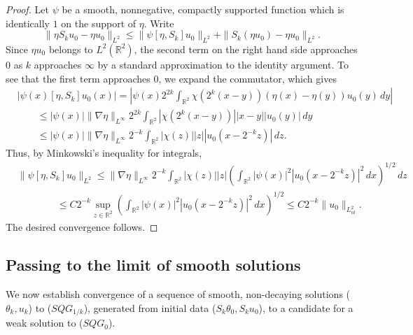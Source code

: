 \documentclass[11pt,reqno,xcolor=svgnames]{amsart}
\def\R{{\mathbb R}}
\theoremstyle{plain}
\theoremstyle{definition}
\theoremstyle{plain}
\theoremstyle{remark}
\newcommand{\abs}[1]{\left\vert#1\right\vert}
\begin{document}
\begin{proof}
Let $\psi$ be a smooth, nonnegative, compactly supported function which is identically $1$ on the support of $\eta$. Write 
\begin{equation*}
\| \eta S_k u_0 -  \eta u_0 \|_{L^{2}} \leq \|\psi [\eta, S_k] u_0 \|_{L^2} + \| S_k(\eta u_0) - \eta u_0 \|_{L^2}.
\end{equation*}
Since $\eta u_0$ belongs to $L^{2}(\R^2)$, the second term on the right hand side approaches $0$ as $k$ approaches $\infty$ by a standard approximation to the identity argument.  To see that the first term approaches $0$, we expand the commutator, which gives
\begin{equation*}
\begin{split}
&\abs{\psi(x)[\eta, S_k] u_0(x)} = \abs{\psi(x)2^{2k}\int_{\R^2} \chi(2^k(x-y))(\eta(x) - \eta(y)) u_0(y) \, dy}  \\
&\qquad \leq \abs{\psi(x)}\|\nabla \eta \|_{L^{\infty}} 2^{2k} \int_{\R^2} |\chi(2^k(x-y))||x-y| |u_0(y)| \, dy\\
&\qquad \leq \abs{\psi(x)}\|\nabla \eta \|_{L^{\infty}} 2^{-k} \int_{\R^2} |\chi(z)||z| |u_0(x-2^{-k}z)| \, dz.
\end{split}
\end{equation*}
Thus, by Minkowski's inequality for integrals,
\begin{equation*}
\begin{split}
&\| \psi[\eta, S_k] u_0\|_{L^2} \leq \|\nabla \eta \|_{L^{\infty}} 2^{-k} \int_{\R^2} |\chi(z)||z|\left(\int_{\R^2}|\psi(x)|^2 |u_0(x-2^{-k}z)|^2 \, dx \right)^{1/2} \, dz\\
&\qquad\qquad \leq C2^{-k} \sup_{z\in\R^2} \left(\int_{\R^2}|\psi(x)|^2 |u_0(x-2^{-k}z)|^2 \, dx \right)^{1/2} \leq C2^{-k} \|u_0\|_{L^2_{ul}}.
\end{split}
\end{equation*}
The desired convergence follows.
\end{proof}




\subsection{Passing to the limit of smooth solutions}
We now establish convergence of a sequence of smooth, non-decaying solutions ($\theta_k,u_k$) to ($SQG_{1/k}$), generated from initial data ($S_k\theta_0, S_ku_0$), to a candidate for a weak solution to ($SQG_0$).  
\end{document}
